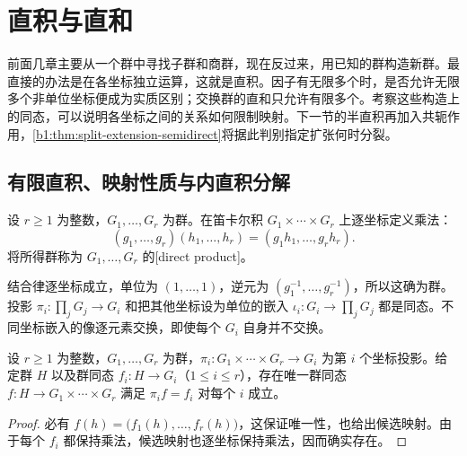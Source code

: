 
\section{直积与直和}
\label{b1:sec:0601}

前面几章主要从一个群中寻找子群和商群，现在反过来，用已知的群构造新群。最直接的办法是在各坐标独立运算，这就是直积。因子有无限多个时，是否允许无限多个非单位坐标便成为实质区别；交换群的直和只允许有限多个。考察这些构造上的同态，可以说明各坐标之间的关系如何限制映射。下一节的半直积再加入共轭作用，\cref{b1:thm:split-extension-semidirect}将据此判别指定扩张何时分裂。


%
%

\subsection{有限直积、映射性质与内直积分解}
\label{b1:subsec:0601:01}

\begin{definition}\label{b1:def:direct-product}
	设 \(r\geq1\) 为整数，\(G_1,\ldots,G_r\) 为群。在笛卡尔积 \(G_1\times\cdots\times G_r\) 上逐坐标定义乘法：
	\[
		(g_1,\ldots,g_r)(h_1,\ldots,h_r) =(g_1h_1,\ldots,g_rh_r).
	\]
	将所得群称为 \(G_1,\ldots,G_r\) 的[direct product]。
\end{definition}

结合律逐坐标成立，单位为 \((1,\ldots,1)\)，逆元为 \((g_1^{-1},\ldots,g_r^{-1})\)，所以这确为群。投影 \(\pi_i:\prod_jG_j\rightarrow G_i\) 和把其他坐标设为单位的嵌入 \(\iota_i:G_i\rightarrow\prod_jG_j\) 都是同态。不同坐标嵌入的像逐元素交换，即使每个 \(G_i\) 自身并不交换。

\begin{proposition}[直积的泛性质]\label{b1:prop:product-universal}
	设 \(r\geq1\) 为整数，\(G_1,\ldots,G_r\) 为群，\(\pi_i:G_1\times\cdots\times G_r\rightarrow G_i\) 为第 \(i\) 个坐标投影。给定群 \(H\) 以及群同态 \(f_i:H\rightarrow G_i\)（\(1\leq i\leq r\)），存在唯一群同态 \(f:H\rightarrow G_1\times\cdots\times G_r\) 满足 \(\pi_i f=f_i\) 对每个 \(i\) 成立。
\end{proposition}
\begin{proof}
	必有 \(f(h)=\bigl(f_1(h),\ldots,f_r(h)\bigr)\)，这保证唯一性，也给出候选映射。由于每个 \(f_i\) 都保持乘法，候选映射也逐坐标保持乘法，因而确实存在。
\end{proof}

